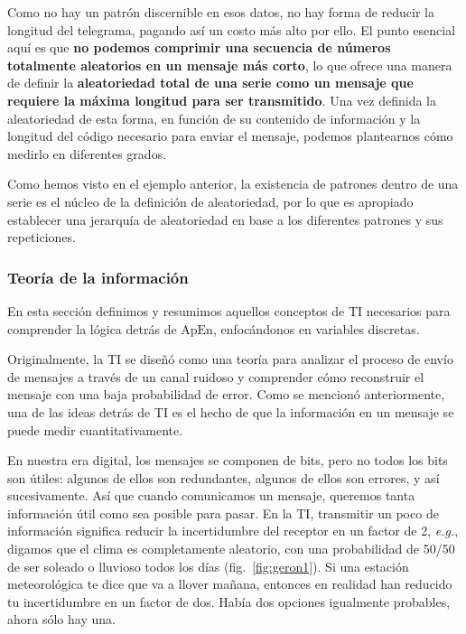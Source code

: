\documentclass[a4paper,12pt]{article}
\begin{document}
Como no hay un patrón discernible en esos datos, no hay forma de reducir la longitud del telegrama, pagando así un costo más alto por ello. El punto esencial aquí es que \textbf{no podemos comprimir una secuencia de números totalmente aleatorios en un mensaje más corto}, lo que ofrece una manera de definir la \textbf{aleatoriedad total de una serie como un mensaje que requiere la máxima longitud para ser transmitido}. Una vez definida la aleatoriedad de esta forma, en función de su contenido de información y la longitud del código necesario para enviar el mensaje, podemos plantearnos cómo medirlo en diferentes grados. 

Como hemos visto en el ejemplo anterior, la existencia de patrones dentro de una serie es el núcleo de la definición de aleatoriedad, por lo que es apropiado establecer una jerarquía de aleatoriedad en base a los diferentes patrones y sus repeticiones.

\subsubsection{Teoría de la información}

En esta sección definimos y resumimos aquellos conceptos de TI necesarios para comprender la lógica detrás de $\textrm{ApEn}$, enfocándonos en variables discretas.

Originalmente, la TI se diseñó como una teoría para analizar el proceso de envío de mensajes a través de un canal ruidoso y comprender cómo reconstruir el mensaje con una baja probabilidad de error. Como se mencionó anteriormente, una de las ideas detrás de TI es el hecho de que la información en un mensaje se puede medir cuantitativamente. 

En nuestra era digital, los mensajes se componen de bits, pero no todos los bits son útiles: algunos de ellos son redundantes, algunos de ellos son errores, y así sucesivamente. Así que cuando comunicamos un mensaje, queremos tanta información útil como sea posible para pasar. En la TI, transmitir un poco de información significa reducir la incertidumbre del receptor en un factor de 2, \textit{e.g.}, digamos que el clima es completamente aleatorio, con una probabilidad de 50/50 de ser soleado o lluvioso todos los días (fig.~\ref{fig:geron1}). Si una estación meteorológica te dice que va a llover mañana, entonces en realidad han reducido tu incertidumbre en un factor de dos. Había dos opciones igualmente probables, ahora sólo hay una. \citep{Geron2018Feb}
\end{document}
